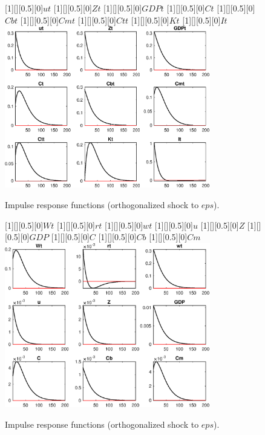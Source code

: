  
\begin{figure}[H]
[1][][0.5][0]{$ut$}
[1][][0.5][0]{$Zt$}
[1][][0.5][0]{$GDPt$}
[1][][0.5][0]{$Ct$}
[1][][0.5][0]{$Cbt$}
[1][][0.5][0]{$Cmt$}
[1][][0.5][0]{$Ctt$}
[1][][0.5][0]{$Kt$}
[1][][0.5][0]{$It$}
\centering 
\includegraphics[width=0.80\textwidth]{DyReiter/graphs/DyReiter_IRF_eps1}
\caption{Impulse response functions (orthogonalized shock to $eps$).}\label{Fig:IRF:eps:1}
\end{figure}
 
\begin{figure}[H]
[1][][0.5][0]{$Wt$}
[1][][0.5][0]{$rt$}
[1][][0.5][0]{$wt$}
[1][][0.5][0]{$u$}
[1][][0.5][0]{$Z$}
[1][][0.5][0]{$GDP$}
[1][][0.5][0]{$C$}
[1][][0.5][0]{$Cb$}
[1][][0.5][0]{$Cm$}
\centering 
\includegraphics[width=0.80\textwidth]{DyReiter/graphs/DyReiter_IRF_eps2}
\caption{Impulse response functions (orthogonalized shock to $eps$).}\label{Fig:IRF:eps:2}
\end{figure}
 
